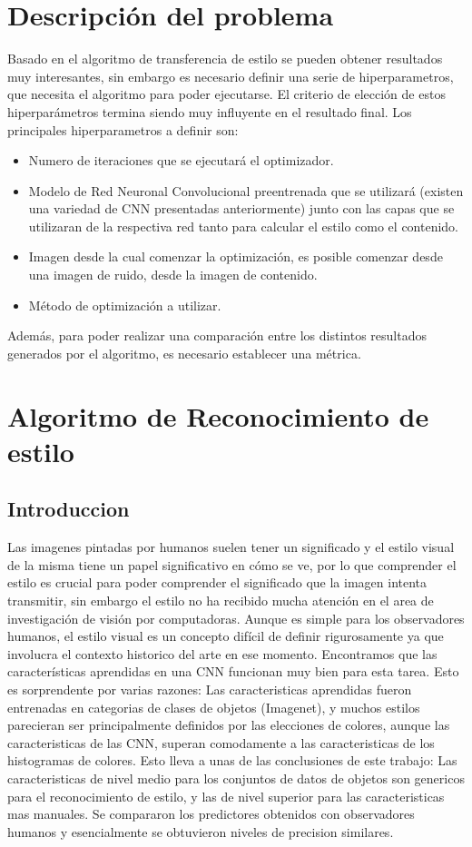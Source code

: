 \documentclass[a4paper,11pt,spanish]{book}
\begin{document}
  \section{Descripción del problema}
    Basado en el algoritmo de transferencia de estilo se pueden obtener resultados muy interesantes, sin embargo es necesario definir una serie de hiperparametros,
    que necesita el algoritmo para poder ejecutarse. El criterio de elección de estos hiperparámetros termina siendo muy influyente en el resultado final. 
    Los principales hiperparametros a definir son:
    \begin{itemize}
      \item Numero de iteraciones que se ejecutará el optimizador.
      \item Modelo de Red Neuronal Convolucional preentrenada que se utilizará (existen una variedad de CNN presentadas anteriormente) junto con las capas que se utilizaran de la 
      respectiva red tanto para calcular el estilo como el contenido.
      \item Imagen desde la cual comenzar la optimización, es posible comenzar desde una imagen de ruido, desde la imagen de contenido.
      \item Método de optimización a utilizar.
    \end{itemize}

    Además, para poder realizar una comparación entre los distintos resultados generados por el algoritmo, es necesario establecer una métrica.
    
  \section{Algoritmo de Reconocimiento de estilo}
    \subsection{Introduccion}
      Las imagenes pintadas por humanos suelen tener un significado y el estilo visual de la misma tiene un papel significativo en cómo se ve, por lo que comprender
      el estilo es crucial para poder comprender el significado que la imagen intenta transmitir, sin embargo el estilo no ha recibido  mucha atención en el area de investigación de visión por computadoras. 
      Aunque es simple para los observadores humanos, el estilo visual es un concepto difícil de definir rigurosamente ya que involucra el contexto historico del arte en ese momento.
      Encontramos que las características aprendidas en una CNN funcionan muy bien para esta tarea. Esto es sorprendente por varias razones: Las caracteristicas aprendidas
      fueron entrenadas en categorias de clases de objetos (Imagenet), y muchos estilos parecieran ser principalmente definidos por las elecciones de colores, aunque
      las caracteristicas de las CNN, superan comodamente a las caracteristicas de los histogramas de colores. Esto lleva a unas de las conclusiones de este trabajo:
      Las caracteristicas de nivel medio para los conjuntos de datos de objetos son genericos para el reconocimiento de estilo, y las de nivel superior para las caracteristicas
      mas manuales.
      Se compararon los predictores obtenidos con observadores humanos y esencialmente se obtuvieron niveles de precision similares.
\end{document}

